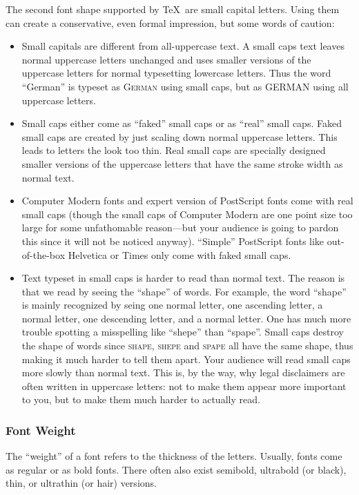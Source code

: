 The second font shape supported by \TeX\ are small capital letters. Using them can create a conservative, even formal impression, but some words of caution:
\begin{itemize}
\item
  Small capitals are different from all-uppercase text. A small caps text leaves normal uppercase letters unchanged and uses smaller versions of the uppercase letters for normal typesetting lowercase letters. Thus the word ``German'' is typeset as \textsc{German} using small caps, but as \uppercase{German} using all uppercase letters.
\item
  Small caps either come as ``faked'' small caps or as ``real'' small caps. Faked small caps are created by just scaling down normal uppercase letters. This leads to letters the look too thin. Real small caps are specially designed smaller versions of the uppercase letters that have the same stroke width as normal text.
\item
  Computer Modern fonts and expert version of PostScript fonts come with real small caps (though the small caps of Computer Modern are one point size too large for some unfathomable reason---but your audience is going to pardon this since it will not be noticed anyway). ``Simple'' PostScript fonts like out-of-the-box Helvetica or Times only come with faked small caps.
\item
  Text typeset in small caps is harder to read than normal text. The reason is that we read by seeing the ``shape'' of words. For example, the word ``shape'' is mainly recognized by seing one normal letter, one ascending letter, a normal letter, one descending letter, and a normal letter. One has much more trouble spotting a misspelling like ``shepe''  than ``spape''. Small caps destroy the shape of words since \textsc{shape}, \textsc{shepe} and \textsc{spape} all have the same shape, thus making it much harder to tell them apart. Your audience will read small caps more slowly than normal text. This is, by the way, why legal disclaimers are often written in uppercase letters: not to make them appear more important to you, but to make them much harder to actually read.
\end{itemize}

\subsubsection{Font Weight}

The ``weight'' of a font refers to the thickness of the letters. Usually, fonts come as regular or as bold fonts. There often also exist semibold, ultrabold (or black), thin, or ultrathin (or hair) versions.

